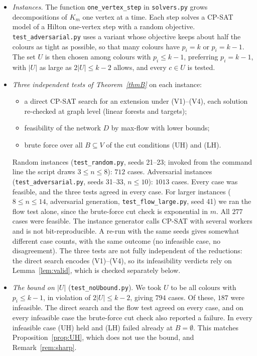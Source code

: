 \documentclass[11pt]{amsart}
\theoremstyle{definition}
\theoremstyle{remark}
\begin{document}
\begin{itemize}[leftmargin=*]
\item \emph{Instances.} The function \texttt{one\_vertex\_step} in \texttt{solvers.py} grows
decompositions of $K_m$ one
vertex at a time. Each step solves a CP-SAT model of a Hilton one-vertex step with a random
objective. \texttt{test\_adversarial.py} uses a variant whose objective keeps about half the
colours as tight as possible, so that many colours have $p_i=k$ or $p_i=k-1$. The set $U$ is
then chosen among colours with $p_i\le k-1$, preferring $p_i=k-1$, with $|U|$ as large as
$2|U|\le k-2$ allows, and every $c\in U$ is tested.

\item \emph{Three independent tests of Theorem~\ref{thmB}} on each instance:
  \begin{itemize}
  \item a direct CP-SAT search for an extension under (V1)--(V4), each solution re-checked at
  graph level (linear forests and targets);
  \item feasibility of the network $D$ by max-flow with lower bounds;
  \item brute force over all $B\subseteq V$ of the cut conditions (UH) and (LH).
  \end{itemize}
  Random instances (\texttt{test\_random.py}, seeds 21--23; invoked from the command line the
  script draws $3\le n\le8$): $712$ cases.
  Adversarial instances (\texttt{test\_adversarial.py}, seeds 31--33, $n\le10$): $1013$ cases.
  Every case was feasible, and the three tests agreed in every case. For larger instances
  ($8\le n\le14$, adversarial generation, \texttt{test\_flow\_large.py}, seed 41) we ran the
  flow test alone, since the brute-force cut check is exponential in $m$. All $277$ cases were
  feasible. The instance generator calls CP-SAT with several workers and is not
  bit-reproducible. A re-run with the same seeds gives somewhat different case counts, with the
  same outcome (no infeasible case, no disagreement). The three tests are not fully independent
  of the reductions: the direct search encodes (V1)--(V4), so its infeasibility verdicts rely on
  Lemma~\ref{lem:valid}, which is checked separately below.

\item \emph{The bound on $|U|$} (\texttt{test\_noUbound.py}). We took $U$ to be all colours with
$p_i\le k-1$, in violation of $2|U|\le k-2$, giving $794$ cases. Of these, $187$ were infeasible.
The direct search and the flow test agreed on every case, and on every infeasible case the
brute-force cut check also reported a failure. In every infeasible case (UH) held and (LH) failed already at
$B=\emptyset$. This matches Proposition~\ref{prop:UH}, which does not use the bound, and
Remark~\ref{rem:sharp}.


\end{itemize}
\end{document}
